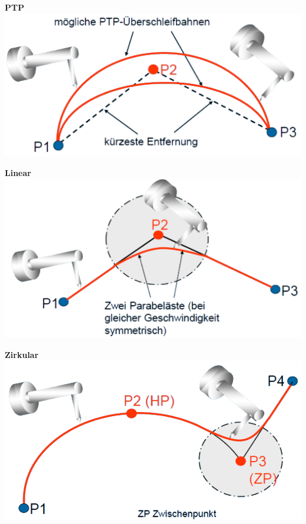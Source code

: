 \begin{minipage}{0.345\linewidth}
    \textbf{PTP}\newline
    \includegraphics[width=\linewidth]{./bilder/UeberschleifenPTP}
\end{minipage}
\begin{minipage}{0.32\linewidth}
    \textbf{Linear}\newline
    \includegraphics[width=\linewidth]{./bilder/UeberschleifenLin}
\end{minipage}
\begin{minipage}{0.32\linewidth}
    \textbf{Zirkular}\newline
    \includegraphics[width=\linewidth]{./bilder/UeberschleifenCirc}
\end{minipage}

